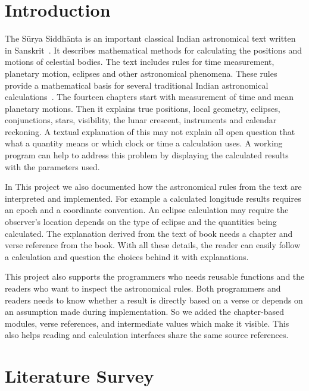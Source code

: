 \documentclass[12pt,a4paper,oneside]{report}
\newcommand{\surya}{Sūrya Siddhānta\xspace}
\begin{document}
\clearpage
{}

\chapter{Introduction}

The \surya is an important classical Indian astronomical text written in Sanskrit~\cite{burgess1860, shrivastava,pandey_ss,plofker2009}. It describes mathematical methods for calculating the positions and motions of celestial bodies. The text includes rules for time measurement, planetary motion, eclipses and other astronomical phenomena. These rules provide a mathematical basis for several traditional Indian astronomical calculations~\cite{oak_week,ss_video}. The fourteen chapters start with measurement of time and mean planetary motions. Then it explains true positions, local geometry, eclipses, conjunctions, stars, visibility, the lunar crescent, instruments and calendar reckoning. A textual explanation of this may not explain all open question that what a quantity means or which clock or time a calculation uses. A working program can help to address this problem by displaying the calculated results with the parameters used.

In This project we also documented how the astronomical rules from the text are interpreted and implemented. For example a calculated longitude results requires an epoch and a coordinate convention. An eclipse calculation may require the observer's location depends on the type of eclipse and the quantities being calculated. The explanation derived from the text of book needs a chapter and verse reference from the book. With all these details, the reader can easily follow a calculation and question the choices behind it with explanations.

This project also supports the programmers who needs reusable functions and the readers who want to inspect the astronomical rules. Both programmers and readers needs to know whether a result is directly based on a verse or depends on an assumption made during implementation. So we added the chapter-based modules, verse references, and intermediate values which make it visible. This also helps reading and calculation interfaces share the same source references.

\chapter{Literature Survey}
\end{document}
